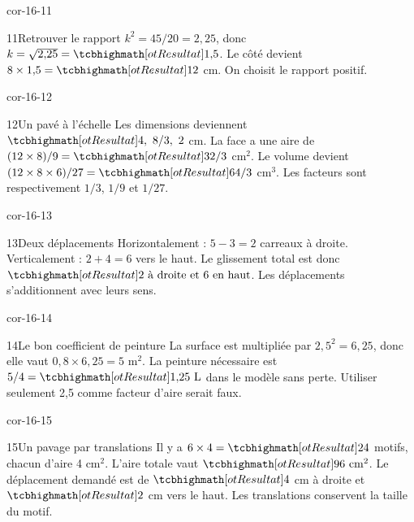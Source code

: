 \begin{blocLivre}{cor-16-11}\begin{corrige}{11}{Retrouver le rapport}
$k^2=45/20=2{,}25$, donc $k=\sqrt{2{,}25}=\res{1{,}5}$. Le côté devient $8\times1{,}5=\res{12}$ cm. On choisit le rapport positif.
\label{fig-cor-16-11}
\end{corrige}\end{blocLivre}
\begin{blocLivre}{cor-16-12}\begin{corrige}{12}{Un pavé à l’échelle}
Les dimensions deviennent $\res{4,\ 8/3,\ 2}$ cm. La face a une aire de $(12\times8)/9=\res{32/3}$ cm$^2$. Le volume devient $(12\times8\times6)/27=\res{64/3}$ cm$^3$. Les facteurs sont respectivement $1/3$, $1/9$ et $1/27$.
\label{fig-cor-16-12}
\end{corrige}\end{blocLivre}
\begin{blocLivre}{cor-16-13}\begin{corrige}{13}{Deux déplacements}
Horizontalement : $5-3=2$ carreaux à droite. Verticalement : $2+4=6$ vers le haut. Le glissement total est donc $\res{2\text{ à droite et }6\text{ en haut}}$. Les déplacements s’additionnent avec leurs sens.
\label{fig-cor-16-13}
\end{corrige}\end{blocLivre}
\begin{blocLivre}{cor-16-14}\begin{corrige}{14}{Le bon coefficient de peinture}
La surface est multipliée par $2{,}5^2=6{,}25$, donc elle vaut $0{,}8\times6{,}25=5$ m$^2$. La peinture nécessaire est $5/4=\res{1{,}25\ \mathrm L}$ dans le modèle sans perte. Utiliser seulement 2,5 comme facteur d’aire serait faux.
\label{fig-cor-16-14}
\end{corrige}\end{blocLivre}
\begin{blocLivre}{cor-16-15}\begin{corrige}{15}{Un pavage par translations}
Il y a $6\times4=\res{24}$ motifs, chacun d’aire 4 cm$^2$. L’aire totale vaut $\res{96\ \mathrm{cm}^2}$. Le déplacement demandé est de $\res4$ cm à droite et $\res2$ cm vers le haut. Les translations conservent la taille du motif.
\label{fig-cor-16-15}
\end{corrige}\end{blocLivre}
